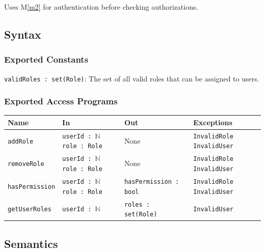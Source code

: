 \documentclass[12pt, titlepage]{article}
\begin{document}
Uses M\ref{m2} for authentication before checking authorizations.

\subsection{Syntax}

\subsubsection{Exported Constants}

\texttt{validRoles : set(Role)}: The set of all valid roles that can be assigned to users.

\subsubsection{Exported Access Programs}

\begin{center}
\begin{tabularx}{\textwidth}{p{} p{} p{} p{}}
\hline
\textbf{Name} & \textbf{In} & \textbf{Out} & \textbf{Exceptions} \\
\hline
\texttt{addRole} & \texttt{userId : $\mathbb{N}$} \newline \texttt{role : Role} & None & \texttt{InvalidRole} \newline \texttt{InvalidUser} \\
\hline
\texttt{removeRole} & \texttt{userId : $\mathbb{N}$} \newline \texttt{role : Role} & None & \texttt{InvalidRole} \newline \texttt{InvalidUser} \\
\hline
\texttt{hasPermission} & \texttt{userId : $\mathbb{N}$} \newline \texttt{role : Role} & \texttt{hasPermission : bool} & \texttt{InvalidRole} \newline \texttt{InvalidUser}  \\
\hline
\texttt{getUserRoles} & \texttt{userId : $\mathbb{N}$} & \texttt{roles : set(Role)} &  \texttt{InvalidUser}\\
\hline
\end{tabularx}
\end{center}

\subsection{Semantics}
\end{document}
